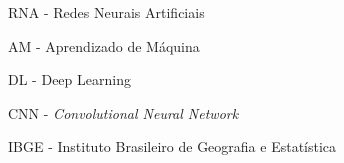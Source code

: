 \begin{siglas}
	\item RNA - Redes Neurais Artificiais
	\item AM - Aprendizado de Máquina
	\item DL - Deep Learning
	\item CNN - \textit{Convolutional Neural Network}
	\item IBGE - Instituto Brasileiro de Geografia e Estatística
\end{siglas}